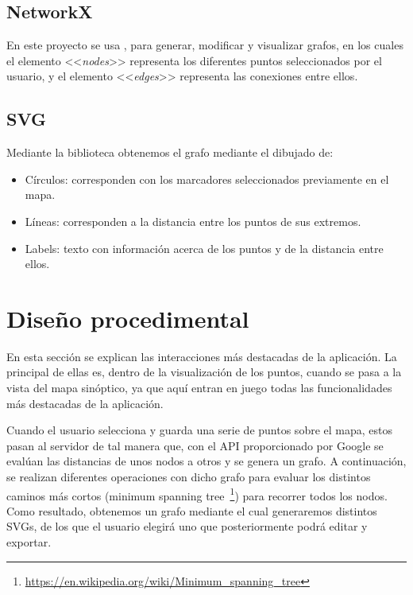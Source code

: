 \subsection{NetworkX}
En este proyecto se usa , para generar, modificar y visualizar grafos, en los cuales el elemento <<\textit{nodes}>> representa los diferentes puntos seleccionados por el usuario, y el elemento <<\textit{edges}>> representa las conexiones entre ellos.


\subsection{SVG}
Mediante la biblioteca  obtenemos el grafo mediante el dibujado de:
\begin{itemize}
	\item Círculos: corresponden con los marcadores seleccionados previamente en el mapa.
	\item Líneas: corresponden a la distancia entre los puntos de sus extremos.
	\item Labels: texto con información acerca de los puntos y de la distancia entre ellos.
\end{itemize}


\section{Diseño procedimental}
En esta sección se explican las interacciones más destacadas de la aplicación. La principal de ellas es, dentro de la visualización de los puntos, cuando se pasa a la vista del mapa sinóptico, ya que aquí entran en juego todas las funcionalidades más destacadas de la aplicación.



Cuando el usuario selecciona y guarda una serie de puntos sobre el mapa, estos pasan al servidor de tal manera que, con el API proporcionado por Google se evalúan las distancias de unos nodos a otros y se genera un grafo. A continuación, se realizan diferentes operaciones con dicho grafo para evaluar los distintos caminos más cortos (minimum spanning tree~\footnote{\url{https://en.wikipedia.org/wiki/Minimum_spanning_tree}}) para recorrer todos los nodos. Como resultado, obtenemos un grafo mediante el cual generaremos distintos SVGs, de los que el usuario elegirá uno que posteriormente podrá editar y exportar.
\\


